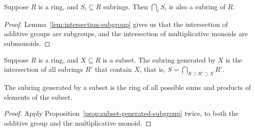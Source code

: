 \begin{lemma}\label{lem:intersection-subring}
    Suppose \(R\) is a ring, and \(S_i \subseteq R\) subrings.
    Then \(\bigcap_i S_i\) is also a subring of \(R\).
\end{lemma}
\begin{proof}
    Lemma~\ref{lem:intersection-subgroup} gives us that
    the intersection of additive groups are subgroups,
    and the intersection of multiplicative monoids are submonoids.
\end{proof}

\begin{definition}
    Suppose \(R\) is a ring, and \(X \subseteq R\) is a subset.
    The subring generated by \(X\)
    is the intersection of all subrings \(R'\) that contain \(X\),
    that is, \(S = \bigcap_{R \supset R' \supset X} R'\).
\end{definition}
\begin{proposition}\label{prop:subset-generated-subring}
    The subring generated by a subset
    is the ring of all possible sums and products of elements of the subset.
\end{proposition}
\begin{proof}
    Apply Proposition~\ref{prop:subset-generated-subgroup} twice,
    to both the additive group and the multiplicative monoid.
\end{proof}

